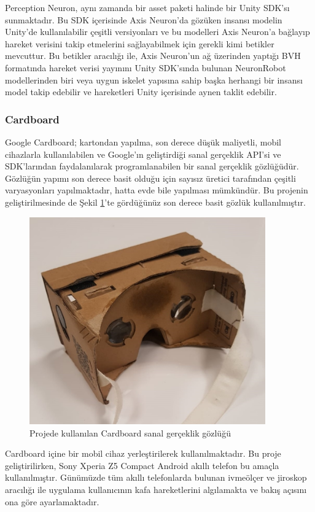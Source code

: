 \documentclass[a4paper, 12pt, titlepage]{article}
\begin{document}
Perception Neuron, aynı zamanda bir asset paketi halinde bir Unity SDK’sı sunmaktadır. Bu SDK
içerisinde Axis Neuron’da gözüken insansı modelin Unity’de kullanılabilir çeşitli versiyonları ve
bu modelleri Axis Neuron’a bağlayıp hareket verisini takip etmelerini sağlayabilmek için gerekli
kimi betikler mevcuttur. Bu betikler aracılığı ile, Axis Neuron’un ağ üzerinden yaptığı BVH
formatında hareket verisi yayınını Unity SDK’sında bulunan NeuronRobot modellerinden biri veya
uygun iskelet yapısına sahip başka herhangi bir insansı model takip edebilir ve hareketleri Unity
içerisinde aynen taklit edebilir.

\subsubsection{Cardboard}
Google Cardboard; kartondan yapılma, son derece düşük maliyetli, mobil cihazlarla kullanılabilen ve
Google’ın geliştirdiği sanal gerçeklik API’si ve SDK’larından faydalanılarak programlanabilen bir
sanal gerçeklik gözlüğüdür. Gözlüğün yapımı son derece basit olduğu için sayısız üretici tarafından
çeşitli varyasyonları yapılmaktadır, hatta evde bile yapılması mümkündür. Bu projenin
geliştirilmesinde de Şekil \ref{cbjpeg}’te gördüğünüz son derece basit gözlük kullanılmıştır.

\begin{figure}[hbt!]
    \centering
        \includegraphics[width=4in]{images/cbjpeg}
    \caption{Projede kullanılan Cardboard sanal gerçeklik gözlüğü}   
    \label{cbjpeg}
\end{figure}

Cardboard içine bir mobil cihaz yerleştirilerek kullanılmaktadır. Bu proje geliştirilirken, Sony
Xperia Z5 Compact Android akıllı telefon bu amaçla kullanılmıştır. Günümüzde tüm akıllı
telefonlarda bulunan ivmeölçer ve jiroskop aracılığı ile uygulama kullanıcının kafa hareketlerini
algılamakta ve bakış açısını ona göre ayarlamaktadır.
\end{document}
